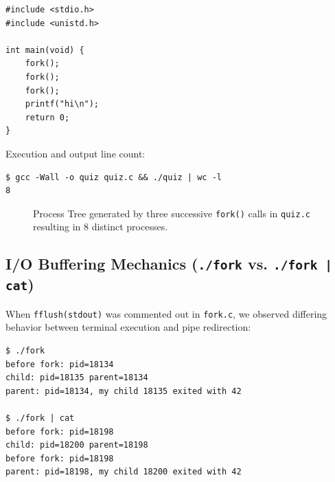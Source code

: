\documentclass[12pt,a4paper]{article}
\begin{document}
\begin{lstlisting}[style=cstyle]
#include <stdio.h>
#include <unistd.h>

int main(void) {
    fork();
    fork();
    fork();
    printf("hi\n");
    return 0;
}
\end{lstlisting}

Execution and output line count:
\begin{lstlisting}[style=consolestyle]
$ gcc -Wall -o quiz quiz.c && ./quiz | wc -l
8
\end{lstlisting}

\begin{figure}[H]
\centering
{}
\caption{Process Tree generated by three successive \texttt{fork()} calls in \texttt{quiz.c} resulting in 8 distinct processes.}
\label{fig:processtree}
\end{figure}

\subsection{I/O Buffering Mechanics (\texttt{./fork} vs. \texttt{./fork | cat})}
When \texttt{fflush(stdout)} was commented out in \texttt{fork.c}, we observed differing behavior between terminal execution and pipe redirection:

\begin{lstlisting}[style=consolestyle]
$ ./fork
before fork: pid=18134
child: pid=18135 parent=18134
parent: pid=18134, my child 18135 exited with 42

$ ./fork | cat
before fork: pid=18198
child: pid=18200 parent=18198
before fork: pid=18198
parent: pid=18198, my child 18200 exited with 42
\end{lstlisting}
\end{document}
